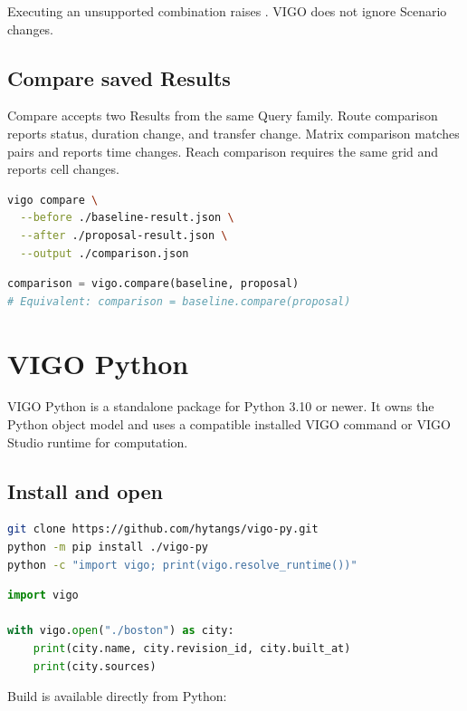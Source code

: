 \documentclass[10pt,letterpaper]{article}
\begin{document}
Executing an unsupported combination raises . VIGO does not ignore Scenario changes.

\subsection{Compare saved Results}

Compare accepts two Results from the same Query family. Route comparison reports status, duration change, and transfer change. Matrix comparison matches pairs and reports time changes. Reach comparison requires the same grid and reports cell changes.

\begin{lstlisting}[language=bash]
vigo compare \
  --before ./baseline-result.json \
  --after ./proposal-result.json \
  --output ./comparison.json
\end{lstlisting}

\begin{lstlisting}[language=Python]
comparison = vigo.compare(baseline, proposal)
# Equivalent: comparison = baseline.compare(proposal)
\end{lstlisting}

\section{VIGO Python}

VIGO Python is a standalone package for Python 3.10 or newer. It owns the Python object model and uses a compatible installed VIGO command or VIGO Studio runtime for computation.

\subsection{Install and open}

\begin{lstlisting}[language=bash]
git clone https://github.com/hytangs/vigo-py.git
python -m pip install ./vigo-py
python -c "import vigo; print(vigo.resolve_runtime())"
\end{lstlisting}

\begin{lstlisting}[language=Python]
import vigo

with vigo.open("./boston") as city:
    print(city.name, city.revision_id, city.built_at)
    print(city.sources)
\end{lstlisting}

Build is available directly from Python:
\end{document}
